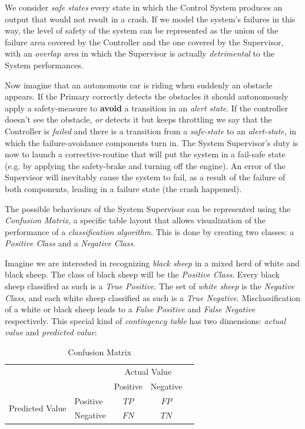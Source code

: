 We consider \textsl{safe states} every state in which the Control System produces an output that would not result in a crash.
If we model the system's failures in this way, the level of safety of the system can be represented as the union of the failure area covered by the Controller and the one covered by the Supervisor, with an \textsl{overlap area} in which the Supervisor is actually \textsl{detrimental} to the System performances.

Now imagine that an autonomous car is riding when suddenly an obstacle appears. If the Primary correctly detects the obstacles it should autonomously apply a safety-measure to \textbf{avoid} a transition in an \textsl{alert state}. If the controller doesn't see the obstacle, \textsl{or} detects it but keeps throttling we say that the Controller is \textsl{failed} and there is a transition from a \textsl{safe-state} to an \textsl{alert-state}, in which the failure-avoidance components turn in. The System Supervisor's duty is now to launch a corrective-routine that will put the system in a fail-safe state (e.g. by applying the safety-brake and turning off the engine). An error of the Supervisor will inevitably cause the system to fail, as a result of the failure of both components, leading in a failure state (the crash happened). 


The possible behaviours of the System Supervisor can be represented using the \textsl{Confusion Matrix}, a specific table layout that allows visualization of the performance of a \textsl{classification algorithm}. This is done by creating two classes: a \textsl{Positive Class} and a \textsl{Negative Class}.

Imagine we are interested in recognizing \textsl{black sheep} in a mixed herd of white and black sheep. The class of black sheep will be the \textsl{Positive Class}. Every black sheep classified as such is a \textsl{True Positive}. The set of \textsl{white sheep} is the \textsl{Negative Class}, and each white sheep classified as such is a \textsl{True Negative}. Misclassification of a white or black sheep leads to a \textsl{False Positive} and \textsl{False Negative} respectively. \cite{wikiconfmatrix}\newline
This special kind of \textsl{contingency table} has two dimensions: \textsl{actual value} and \textsl{predicted value}:

\vspace{0.5cm}

\begin{table}[h!]
	\begin{tabular}{l|l|c|c|c}
		\multicolumn{2}{c}{}&\multicolumn{2}{c}{Actual Value}&\\
		\cline{3-4}
		\multicolumn{2}{c|}{}&Positive&Negative& \\
		\cline{2-4}
		\multirow{2}{*}{Predicted Value}& Positive & $TP$ & $FP$ & \\
		\cline{2-4}
		& Negative & $FN$ & $TN$ & \\
		\cline{2-4}
	\end{tabular}
	\caption{Confusion Matrix}
\end{table}



